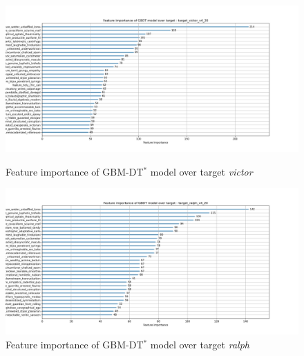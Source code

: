 \documentclass[12pt, a4paper]{article}
\begin{document}
\begin{figure}[htbp]
\begin{minipage}[t]{9cm}
\vspace{0pt}
\centering
\includegraphics[width=1\textwidth,trim={0 0 0 0},clip]{rounds/2024-01-17_round1_feature_importance_target_victor_v4_20.png}
\caption[Feature importance of model victor]{Feature importance of GBM-DT$^{\ast}$ model over target \textit{victor}}
\label{fig: fi_victor}
\end{minipage}
\hfill
\begin{minipage}[t]{9cm}
\vspace{0pt}
\centering
\includegraphics[width=1\textwidth,trim={0 0 0 0},clip]{rounds/2024-01-17_round1_feature_importance_target_ralph_v4_20.png}
\caption[Feature importance of model ralph]{Feature importance of GBM-DT$^{\ast}$ model over target \textit{ralph}}
\label{fig: fi_ralph}
\end{minipage}
\end{figure}
\end{document}
